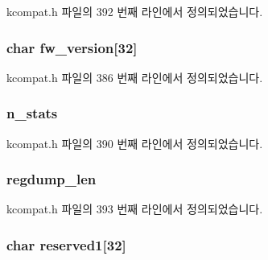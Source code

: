 kcompat.\+h 파일의 392 번째 라인에서 정의되었습니다.

\subsubsection[{\texorpdfstring{fw\+\_\+version}{fw_version}}]{\setlength{\rightskip}{0pt plus 5cm}char fw\+\_\+version\mbox{[}32\mbox{]}}\hypertarget{structk__ethtool__drvinfo_a0c0348cd3d20dead23c571d91ca11a8f}{}\label{structk__ethtool__drvinfo_a0c0348cd3d20dead23c571d91ca11a8f}


kcompat.\+h 파일의 386 번째 라인에서 정의되었습니다.

\subsubsection[{\texorpdfstring{n\+\_\+stats}{n_stats}}]{ n\+\_\+stats}\hypertarget{structk__ethtool__drvinfo_a2b16bc73f229056a84b161491538fedd}{}\label{structk__ethtool__drvinfo_a2b16bc73f229056a84b161491538fedd}


kcompat.\+h 파일의 390 번째 라인에서 정의되었습니다.

\subsubsection[{\texorpdfstring{regdump\+\_\+len}{regdump_len}}]{ regdump\+\_\+len}\hypertarget{structk__ethtool__drvinfo_abb1429e365f206b0f1fbbe870fe26dde}{}\label{structk__ethtool__drvinfo_abb1429e365f206b0f1fbbe870fe26dde}


kcompat.\+h 파일의 393 번째 라인에서 정의되었습니다.

\subsubsection[{\texorpdfstring{reserved1}{reserved1}}]{\setlength{\rightskip}{0pt plus 5cm}char reserved1\mbox{[}32\mbox{]}}\hypertarget{structk__ethtool__drvinfo_a6070532541867232a8dfe5362db10bff}{}\label{structk__ethtool__drvinfo_a6070532541867232a8dfe5362db10bff}


